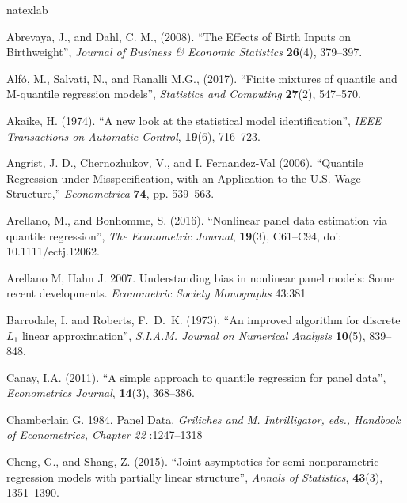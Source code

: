 \documentclass[12pt]{article}
\begin{document}
\begin{thebibliography}{7}
\expandafter\ifx\csname natexlab\endcsname\relax\def\natexlab#1{#1}\fi

Abrevaya, J., and Dahl, C. M., (2008).
\newblock ``The Effects of Birth Inputs on Birthweight'',
\newblock \textit{Journal of Business \& Economic Statistics} \textbf{26}(4), 379--397.

Alf\'o, M., Salvati, N., and Ranalli M.G., (2017).
\newblock ``Finite mixtures of quantile and M-quantile regression models'',
\newblock \textit{Statistics and Computing} \textbf{27}(2), 547--570.

Akaike, H. (1974).
\newblock ``A new look at the statistical model identification'',
\newblock \textit{IEEE Transactions on Automatic Control}, \textbf{19}(6), 716--723.

 Angrist, J. D., Chernozhukov, V., and
I. Fernandez-Val (2006).
\newblock ``Quantile Regression under
Misspecification, with an Application to the U.S. Wage Structure,''
\newblock \textit{Econometrica}  \textbf{74}, pp. 539--563.


Arellano, M., and Bonhomme, S. (2016).
\newblock ``Nonlinear panel data estimation via quantile regression'',
\newblock \textit{The Econometric Journal}, \textbf{19}(3), C61--C94, doi: 10.1111/ectj.12062.

Arellano M, Hahn J. 2007.
{Understanding bias in nonlinear panel models: Some recent developments}.
\textit{Econometric Society Monographs} 43:381

Barrodale, I. and Roberts, F.~D.~K. (1973).
\newblock ``An improved algorithm for discrete $L_1$ linear approximation'',
\newblock \textit{S.I.A.M. Journal on Numerical Analysis} \textbf{10}(5), 839--848.

Canay, I.A. (2011).
\newblock ``A simple approach to quantile regression for panel data'',
\newblock \textit{Econometrics Journal}, \textbf{14}(3), 368--386.

Chamberlain G. 1984.
{Panel Data}.
\textit{Griliches and M. Intrilligator, eds., Handbook of Econometrics, Chapter
  22} :1247--1318
  
Cheng, G., and Shang, Z. (2015).
\newblock ``Joint asymptotics for semi-nonparametric regression models with partially linear structure'',
\newblock \textit{Annals of Statistics}, \textbf{43}(3), 1351--1390.


\end{thebibliography}
\end{document}
